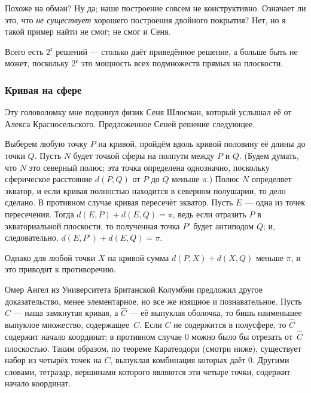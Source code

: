 Похоже на обман?
Ну да; наше построение совсем не конструктивно.
Означает ли это, что \emph{не существует} хорошего построения двойного покрытия?
Нет, но я такой пример найти не смог; не смог и Сеня.

\begin{addedbytheeditors}
Всего есть $2^{\mathfrak{c}}$ решений --- столько даёт приведённое решение, а больше быть не может, поскольку $2^{\mathfrak{c}}$ это мощность всех подмножеств прямых на плоскости.\pr
\end{addedbytheeditors}


\subsubsection*{Кривая на сфере}

Эту головоломку мне подкинул физик Сеня Шлосман, который услышал её от Алекса Красносельского.
Предложенное Сеней решение следующее.

Выберем любую точку $P$ на кривой, пройдём вдоль кривой половину её длины до точки $Q$.
Пусть $N$ будет точкой сферы на полпути между $P$ и $Q$.
(Будем думать, что $N$ это северный полюс; эта точка определена однозначно, поскольку сферическое расстояние $d(P, Q)$ от $P$ до $Q$ меньше $\pi$.)
Полюс $N$ определяет экватор, и если кривая полностью находится в северном полушарии, то дело сделано.
В противном случае кривая пересечёт экватор.
Пусть $E$ --- одна из точек пересечения.
Тогда $d(E,P) + d(E,Q) = \pi$, ведь если отразить $P$ в экваториальной плоскости, то полученная точка $P'$ будет антиподом $Q$; и, следовательно, $d(E, P') + d(E, Q) = \pi$.

Однако для любой точки $X$ на кривой сумма $d(P, X) + d(X, Q)$ меньше $\pi$, и это приводит к противоречию.

Омер Ангел из Университета Британской Колумбии
предложил другое доказательство,
менее элементарное, но все же изящное и познавательное.
Пусть $C$ --- наша замкнутая кривая, а $\hat C$ --- её выпуклая оболочка, то бишь наименьшее выпуклое множество, содержащее~$C$.
Если $C$ не содержится в полусфере, то $\hat C$ содержит начало координат;
в противном случае $0$ можно было бы отрезать от~$\hat C$ плоскостью.
Таким образом, по теореме Каратеодори (смотри ниже), существует набор из четырёх точек на $C$, выпуклая комбинация которых даёт $0$.
Другими словами, тетраэдр, вершинами которого являются эти четыре точки, содержит начало координат.

